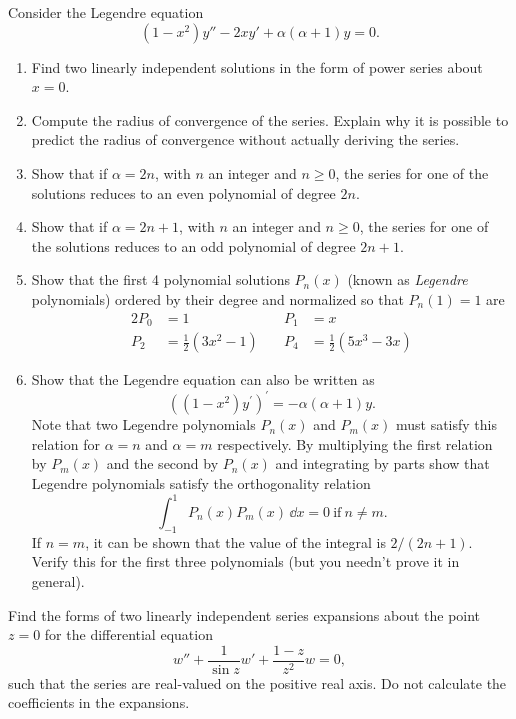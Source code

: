 {%
\begin{Exercise}
  \label{exercise legendre eqn}
  Consider the Legendre equation
  \[
  (1-x^2) y'' - 2 x y' + \alpha (\alpha+1) y = 0.
  \]
  \begin{enumerate}
  \item
    Find two linearly independent solutions in the form of power series about
    $x = 0$.
  \item
    Compute the radius of convergence of the series.  Explain why it is possible
    to predict the radius of convergence without actually deriving
    the series.
  \item
    Show that if $\alpha = 2n$, with $n$ an integer and $n \geq 0$, the series
    for one of the solutions reduces to an even polynomial of degree $2n$.
  \item
    Show that if $\alpha = 2n+1$, with $n$ an integer and $n \geq 0$, the series
    for one of the solutions reduces to an odd polynomial of degree $2n+1$.
  \item
    Show that the first 4 polynomial solutions $P_n(x)$ (known as
    \textit{Legendre} polynomials) ordered by their degree and normalized
    so that $P_n(1) = 1$ are
    \begin{alignat*}{2}
      P_0 &= 1 &\quad P_1 &= x \\
      P_2 &= \frac{1}{2} (3 x^2 - 1) &\quad P_4 &= \frac{1}{2} (5 x^3 - 3 x)
    \end{alignat*}
  \item Show that the Legendre equation can also be written as
    \[ 
    ( (1 - x^2) y^\prime )^\prime = - \alpha (\alpha + 1) y.
    \]
    Note that two Legendre polynomials $P_n(x)$ and $P_m(x)$ must satisfy
    this relation for $\alpha=n$ and $\alpha=m$ respectively. By multiplying
    the first relation by $P_m(x)$ and the second by $P_n(x)$ and integrating
    by parts show that Legendre polynomials satisfy the orthogonality relation
    \[ 
    \int_{-1}^1 P_n(x) P_m(x) \,\dd x = 0\ \mathrm{if}\ n \neq m.
    \] 
    If $n = m$, it can be shown that the value of the integral is $2/(2 n + 1)$. 
    Verify this for the first three polynomials (but you needn't prove it in 
    general).  
  \end{enumerate}

\end{Exercise}



\begin{Exercise} 
  \label{exercise w1sinzw1zz2w=0}
  Find the forms of two linearly independent series expansions about the
  point $z = 0$ for the differential equation
  \[ w'' + \frac{1}{\sin z} w' + \frac{1 - z}{z^2}w = 0,\]
  such that the series are real-valued on the positive real axis.
  Do not calculate the coefficients in the expansions.


\end{Exercise}}
